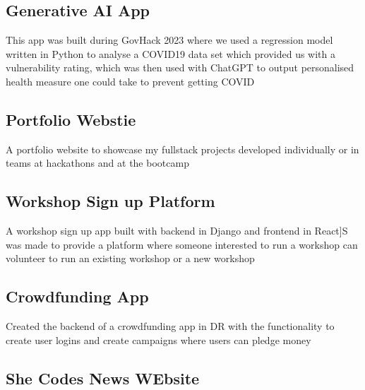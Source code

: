 \documentclass[11pt, a4paper]{MagicalCV}
\begin{document}
\newpage
\begin{minipage}[t]{1\textwidth}
\sectionsep

\sectionsep

\subsection{Generative AI App} 
This app was built during GovHack 2023 where we used a regression model written in Python to analyse a COVID19 data set which provided us with a vulnerability rating, which was then used with ChatGPT to output personalised health measure one could take to prevent getting COVID
\sectionsep

\subsection{Portfolio Webstie} 

A portfolio website to showcase my fullstack projects developed individually or in teams at hackathons and at the bootcamp
\sectionsep

\subsection{Workshop Sign up Platform} 

 A workshop sign up app built with backend in Django and frontend in React]S was made to provide a platform where someone interested to run a workshop can volunteer to run an existing workshop or a new workshop
\sectionsep

\subsection{Crowdfunding App}
 
Created the backend of a crowdfunding app in DR with the functionality to create user logins and create campaigns where users can pledge money
\sectionsep

\subsection{She Codes News WEbsite}
 

\end{minipage}
\end{document}
